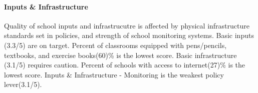 \documentclass[
]{article}
\begin{document}
\hypertarget{inputs-infrastructure}{%
\paragraph{\texorpdfstring{\textbf{Inputs \&
Infrastructure}}{Inputs \& Infrastructure}}\label{inputs-infrastructure}}

Quality of school inputs and infrastrucutre is affected by physical
infrastructure standards set in policies, and strength of school
monitoring systems. Basic inputs (3.3/5) are on target. Percent of
classrooms equipped with pens/pencils, textbooks, and exercise
books(60)\% is the lowest score. Basic infrastructure (3.1/5) requires
caution. Percent of schools with access to internet(27)\% is the lowest
score. Inputs \& Infrastructure - Monitoring is the weakest policy
lever(3.1/5).
\end{document}
